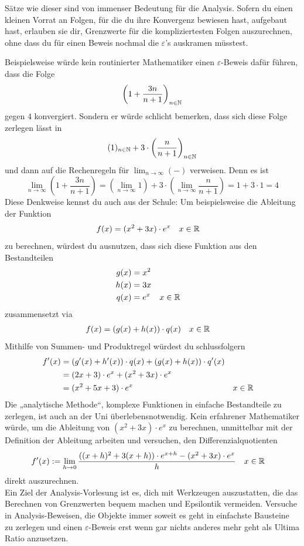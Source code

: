 \begin{bem}
    Sätze wie dieser sind von immenser Bedeutung für die Analysis. Sofern du einen kleinen Vorrat an Folgen, für die du ihre Konvergenz bewiesen hast, aufgebaut hast, erlauben sie dir, Grenzwerte für die kompliziertesten Folgen auszurechnen, ohne dass du für einen Beweis nochmal die $\varepsilon$'s auskramen müsstest.
    
    Beispielsweise würde kein routinierter Mathematiker einen $\varepsilon$-Beweis dafür führen, dass die Folge
        \[ \left( 1 + \frac{3n}{n+1} \right)_{n\in \mathbb N} \]
    gegen $4$ konvergiert. Sondern er würde schlicht bemerken, dass sich diese Folge zerlegen lässt in
        \[ (1)_{n\in \mathbb N} + 3\cdot \left(\frac{n}{n+1}\right)_{n\in \mathbb N} \]
    und dann auf die Rechenregeln für $\lim_{n\to\infty}(-)$ verweisen. Denn es ist
        \[ \lim_{n\to \infty} \left( 1+ \frac{3n}{n+1} \right) = \left( \lim_{n\to \infty} 1 \right)+3\cdot \left( \lim_{n\to \infty} \frac{n}{n+1} \right) = 1+3\cdot 1 = 4 \]
    Diese Denkweise kennst du auch aus der Schule: Um beispielsweise die Ableitung der Funktion
    \begin{align*}
        f(x) &= (x^2+3x)\cdot e^x && x\in \mathbb R
    \end{align*}
    zu berechnen, würdest du ausnutzen, dass sich diese Funktion aus den Bestandteilen
    \begin{align*}
        g(x)& = x^2 \\
        h(x) & = 3x \\
        q(x) &= e^x && x\in \mathbb R
    \end{align*}
    zusammensetzt via
    \begin{align*}
        f(x) & = (g(x)+h(x))\cdot q(x) && x\in \mathbb R
    \end{align*}
    Mithilfe von Summen- und Produktregel würdest du schlussfolgern
    \begin{align*}
        f'(x) & = (g'(x)+h'(x))\cdot q(x)  + (g(x)+h(x))\cdot q'(x) \\
        & = (2x+3)\cdot e^x + (x^2+3x)\cdot e^x \\
        & = (x^2+5x+3)\cdot e^x && x\in \mathbb R
    \end{align*}
    Die „analytische Methode“, komplexe Funktionen in einfache Bestandteile zu zerlegen, ist auch an der Uni überlebensnotwendig. Kein erfahrener Mathematiker würde, um die Ableitung von $(x^2+3x)\cdot e^x$ zu berechnen, unmittelbar mit der Definition der Ableitung arbeiten und versuchen, den Differenzialquotienten
    \begin{align*}
        f'(x)&:=\lim_{h\to 0} \frac{((x+h)^2+3(x+h))\cdot e^{x+h} - (x^2+3x)\cdot e^{x}}{h} && x\in \mathbb R
    \end{align*}
    direkt auszurechnen. \\[0.5em]
    Ein Ziel der Analysis-Vorlesung ist es, dich mit Werkzeugen auszustatten, die das Berechnen von Grenzwerten bequem machen und Epsilontik vermeiden. Versuche in Analysis-Beweisen, die Objekte immer soweit es geht in einfachste Bausteine zu zerlegen und einen $\varepsilon$-Beweis erst wenn gar nichts anderes mehr geht als Ultima Ratio anzusetzen.
\end{bem}


